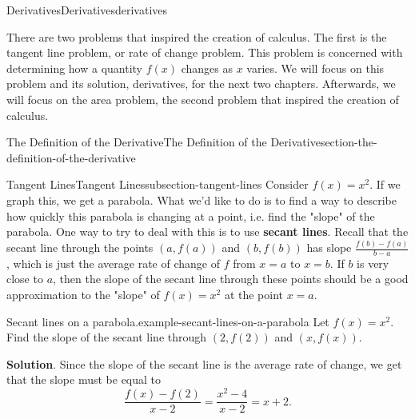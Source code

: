 \documentclass[oneside,10pt,]{book}
\newcommand{\terminology}[1]{\textbf{#1}}
\numberwithin{equation}{section}
\begin{document}
\begin{chapterptx}{Derivatives}{}{Derivatives}{}{}{derivatives}
\begin{introduction}{}%
\hypertarget{p-74}{}%
There are two problems that inspired the creation of calculus. The first is the tangent line problem, or rate of change problem. This problem is concerned with determining how a quantity \(f(x)\) changes as \(x\) varies. We will focus on this problem and its solution, derivatives, for the next two chapters. Afterwards, we will focus on the area problem, the second problem that inspired the creation of calculus.%
\end{introduction}%
%
%
\typeout{************************************************}
\typeout{************************************************}
%
\begin{sectionptx}{The Definition of the Derivative}{}{The Definition of the Derivative}{}{}{section-the-definition-of-the-derivative}
%
%
\typeout{************************************************}
\typeout{************************************************}
%
\begin{subsectionptx}{Tangent Lines}{}{Tangent Lines}{}{}{subsection-tangent-lines}
\hypertarget{p-75}{}%
Consider \(f(x) = x^{2}\). If we graph this, we get a parabola. What we'd like to do is to find a way to describe how quickly this parabola is changing at a point, i.e. find the "slope" of the parabola. One way to try to deal with this is to use \terminology{secant lines}. Recall that the secant line through the points \((a,f(a))\) and \((b,f(b))\) has slope \(\frac{f(b) - f(a)}{b-a}\), which is just the average rate of change of \(f\) from \(x=a\) to \(x=b\). If \(b\) is very close to \(a\), then the slope of the secant line through these points should be a good approximation to the "slope" of \(f(x) = x^{2}\) at the point \(x=a\).%
\begin{example}{Secant lines on a parabola.}{example-secant-lines-on-a-parabola}%
\hypertarget{p-76}{}%
Let \(f(x) = x^{2}\). Find the slope of the secant line through \((2,f(2))\) and \((x,f(x))\).%
\par\smallskip%
\noindent\textbf{Solution}.\hypertarget{solution-16}{}\quad%
\hypertarget{p-77}{}%
Since the slope of the secant line is the average rate of change, we get that the slope must be equal to%
\begin{equation*}
\frac{f(x) - f(2)}{x-2} = \frac{x^{2} - 4}{x-2} = x+2.
\end{equation*}

\end{example}
\end{subsectionptx}
\end{sectionptx}
\end{chapterptx}
\end{document}
